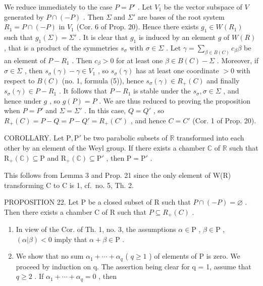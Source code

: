 We reduce immediately to the case \(P = P'\) . Let \(V_1\) be the vector subspace of \(V\) generated by \(P \cap (-P)\) . Then \(\Sigma\) and \(\Sigma'\) are bases of the root system \(R_1 = P \cap (-P)\) in \(V_1\) (Cor. 6 of Prop. 20). Hence there exists \(g_1 \in W(R_1)\) such that \(g_1(\Sigma) = \Sigma'\) . It is clear that \(g_1\) is induced by an element \(g\) of \(W(R)\) , that is a product of the symmetries \(s_\sigma\) with \(\sigma \in \Sigma\) . Let \(\gamma = \sum_{\beta \in B(C)} c_\beta \beta\) be an element of \(P - R_1\) . Then \(c_\beta > 0\) for at least one \(\beta \in B(C) - \Sigma\) . Moreover, if \(\sigma \in \Sigma\) , then \(s_\sigma(\gamma) - \gamma \in V_1\) , so \(s_\sigma(\gamma)\) has at least one coordinate \(> 0\) with respect to \(B(C)\) (no. 1, formula (5)), hence \(s_\sigma(\gamma) \in R_+(C)\) and finally \(s_\sigma(\gamma) \in P - R_1\) . It follows that \(P - R_1\) is stable under the \(s_\sigma, \sigma \in \Sigma\) , and hence under \(g\) , so \(g(P) = P\) . We are thus reduced to proving the proposition when \(P = P'\) and \(\Sigma = \Sigma'\) . In this case, \(Q = Q'\) , so \(R_+(C) = P - Q = P - Q' = R_+(C')\) , and hence \(C = C'\) (Cor. 1 of Prop. 20).

COROLLARY. Let \(\mathrm{P}, \mathrm{P}'\) be two parabolic subsets of \(\mathbb{R}\) transformed into each other by an element of the Weyl group. If there exists a chamber \(\mathbb{C}\) of \(\mathbb{R}\) such that \(\mathrm{R}_{+}(\mathbb{C}) \subseteq \mathrm{P}\) and \(\mathrm{R}_{+}(\mathbb{C}) \subseteq \mathrm{P}'\) , then \(\mathrm{P} = \mathrm{P}'\) .

This follows from Lemma 3 and Prop. 21 since the only element of W(R) transforming C to C is 1, cf.~no. 5, Th. 2.

PROPOSITION 22. Let P be a closed subset of R such that \(P \cap (-P) = \varnothing\) . Then there exists a chamber C of R such that \(P \subseteq R_{+}(C)\) .

\begin{enumerate}
\def\labelenumi{\arabic{enumi})}
\item
  In view of the Cor. of Th. 1, no. 3, the assumptions \(\alpha \in \mathrm{P}\) , \(\beta \in \mathrm{P}\) , \((\alpha |\beta) < 0\) imply that \(\alpha + \beta \in \mathrm{P}\) .
\item
  We show that no sum \(\alpha_{1} + \cdots + \alpha_{q}\) ( \(q \geqslant 1\) ) of elements of P is zero. We proceed by induction on q. The assertion being clear for q = 1, assume that \(q \geqslant 2\) . If \(\alpha_{1} + \cdots + \alpha_{q} = 0\) , then
\end{enumerate}

